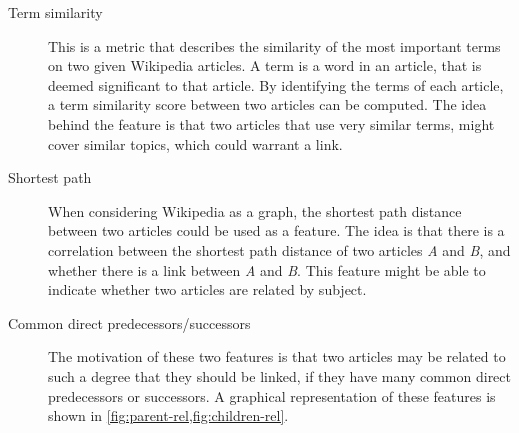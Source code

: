 \begin{description}
    \item[Term similarity] This is a metric that describes the similarity of the most important terms on two given Wikipedia articles. A term is a word in an article, that is deemed significant to that article. By identifying the terms of each article, a term similarity score between two articles can be computed. The idea behind the feature is that two articles that use very similar terms, might cover similar topics, which could warrant a link.
    \item[Shortest path] When considering Wikipedia as a graph, the shortest path distance between two articles could be used as a feature. The idea is that there is a correlation between the shortest path distance of two articles \emph{A} and \emph{B}, and whether there is a link between \emph{A} and \emph{B}. This feature might be able to indicate whether two articles are related by subject.
    \item[Common direct predecessors/successors] The motivation of these two features is that two articles may be related to such a degree that they should be linked, if they have many common direct predecessors or successors. A graphical representation of these features is shown in \cref{fig:parent-rel,fig:children-rel}.
\end{description}

